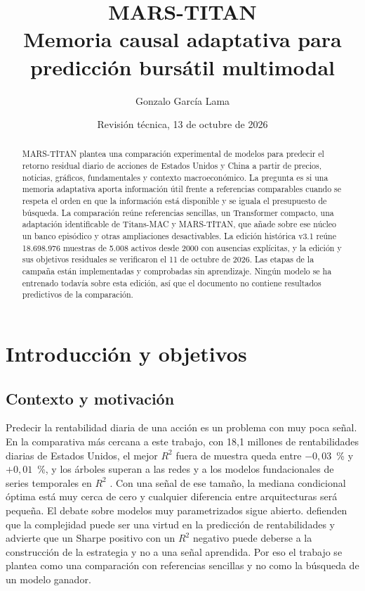 \documentclass[11pt,a4paper]{report}
\title{MARS-TITAN\\\large Memoria causal adaptativa para predicción bursátil multimodal}
\author{Gonzalo García Lama}
\date{Revisión técnica, 13 de octubre de 2026}
\begin{document}
\maketitle
\begin{abstract}
MARS-TITAN plantea una comparación experimental de modelos para predecir el
retorno residual diario de acciones de Estados Unidos y China a partir de
precios, noticias, gráficos, fundamentales y contexto macroeconómico. La
pregunta es si una memoria adaptativa aporta información útil frente a
referencias comparables cuando se respeta el orden en que la información está
disponible y se iguala el presupuesto de búsqueda. La comparación reúne
referencias sencillas, un Transformer compacto, una adaptación identificable
de Titans-MAC y MARS-TITAN, que añade sobre ese núcleo un banco episódico y
otras ampliaciones desactivables. La edición histórica v3.1 reúne 18.698.976
muestras de 5.008 activos desde 2000 con ausencias explícitas, y la edición y
sus objetivos residuales se verificaron el 11 de octubre de 2026. Las etapas de
la campaña están implementadas y comprobadas sin aprendizaje. Ningún modelo se
ha entrenado todavía sobre esta edición, así que el documento no contiene
resultados predictivos de la comparación.
\end{abstract}
\tableofcontents

\chapter{Introducción y objetivos}

\section{Contexto y motivación}
Predecir la rentabilidad diaria de una acción es un problema con muy poca señal.
En la comparativa más cercana a este trabajo, con 18,1 millones de
rentabilidades diarias de Estados Unidos, el mejor $R^2$ fuera de muestra queda
entre $-0{,}03$~\% y $+0{,}01$~\%, y los árboles superan a las redes y a los
modelos fundacionales de series temporales en $R^2$
\parencite{rahimikia2025tsfmfinance}.
Con una señal de ese tamaño, la mediana condicional óptima está muy cerca de
cero y cualquier diferencia entre arquitecturas será pequeña. El debate sobre
modelos muy parametrizados sigue abierto. \textcite{kelly2024virtue} defienden
que la complejidad puede ser una virtud en la predicción de rentabilidades y
\textcite{nagel2025seemingly} advierte que un Sharpe positivo con un $R^2$
negativo puede deberse a la construcción de la estrategia y no a una señal
aprendida. Por eso el trabajo se plantea como una comparación con referencias
sencillas y no como la búsqueda de un modelo ganador.
\end{document}
